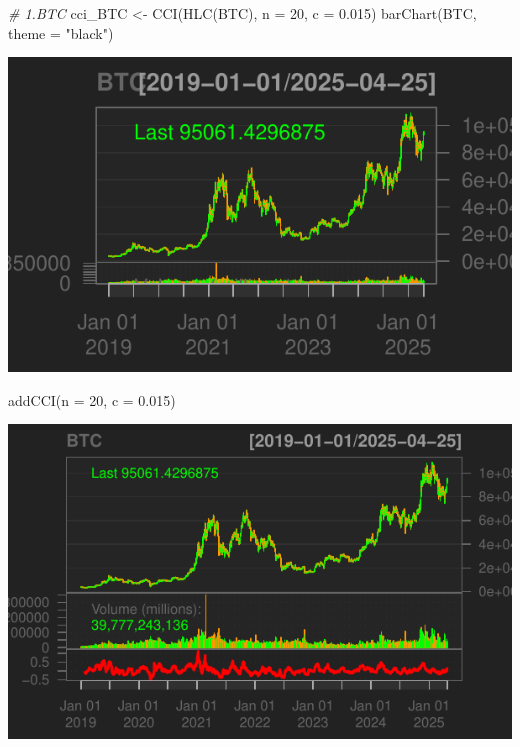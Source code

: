 \documentclass[]{tufte-handout}
\newenvironment{Shaded}{}{}
\newcommand{\AttributeTok}[1]{\textcolor[rgb]{0.49,0.56,0.16}{#1}}
\newcommand{\CommentTok}[1]{\textcolor[rgb]{0.38,0.63,0.69}{\textit{#1}}}
\newcommand{\DecValTok}[1]{\textcolor[rgb]{0.25,0.63,0.44}{#1}}
\newcommand{\FloatTok}[1]{\textcolor[rgb]{0.25,0.63,0.44}{#1}}
\newcommand{\FunctionTok}[1]{\textcolor[rgb]{0.02,0.16,0.49}{#1}}
\newcommand{\NormalTok}[1]{#1}
\newcommand{\OtherTok}[1]{\textcolor[rgb]{0.00,0.44,0.13}{#1}}
\newcommand{\StringTok}[1]{\textcolor[rgb]{0.25,0.44,0.63}{#1}}
\begin{document}
\begin{Shaded}
\begin{Highlighting}[]
\CommentTok{\# 1.BTC}
\NormalTok{cci\_BTC }\OtherTok{\textless{}{-}} \FunctionTok{CCI}\NormalTok{(}\FunctionTok{HLC}\NormalTok{(BTC), }\AttributeTok{n =} \DecValTok{20}\NormalTok{, }\AttributeTok{c =} \FloatTok{0.015}\NormalTok{)}
\FunctionTok{barChart}\NormalTok{(BTC, }\AttributeTok{theme =} \StringTok{"black"}\NormalTok{)}
\end{Highlighting}
\end{Shaded}

\includegraphics{cripto_update_files/figure-latex/unnamed-chunk-12-1}

\begin{Shaded}
\begin{Highlighting}[]
\FunctionTok{addCCI}\NormalTok{(}\AttributeTok{n =} \DecValTok{20}\NormalTok{, }\AttributeTok{c =} \FloatTok{0.015}\NormalTok{)}
\end{Highlighting}
\end{Shaded}

\includegraphics{cripto_update_files/figure-latex/unnamed-chunk-12-2}
\end{document}
